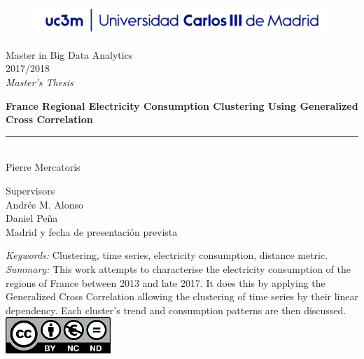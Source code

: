 \begin{titlepage}
\begin{sffamily}
\color{azulUC3M}
\begin{center}
\begin{figure}[htb]
\begin{center}
\vspace*{0.6cm}
\includegraphics[width=15cm]{./latex/imagenes/Portada_Logo.png}
\vspace*{1.6cm}
\end{center}
\end{figure}
\begin{LARGE}
Master in Big Data Analytics \\%
2017/2018 \\%
\vspace*{1cm}
\textsl{Master's Thesis}\\
\end{LARGE}
\Huge{\textbf{France Regional Electricity Consumption Clustering Using Generalized Cross Correlation}} %
\vspace*{1cm}
\rule{80mm}{0.1mm}\\
\huge{Pierre Mercatoris}\\ %
\vspace*{0.5cm}
\begin{Large}
Supervisors\\

Andrés M. Alonso\\
Daniel Peña\\
Madrid y fecha de presentación prevista\\
\end{Large}
\end{center}
\vspace*{1cm}
\color{black}
\emph{Keywords:} Clustering, time series, electricity consumption, distance metric. \\
\emph{Summary:} This work attempts to characterise the electricity consumption
of the regions of France between 2013 and late 2017. It does this by applying
the Generalized Cross Correlation allowing the clustering of time series by
their linear dependency. Each cluster's trend and consumption patterns are then discussed.\\
\includegraphics{./latex/imagenes/creativecommons.png}\\


\end{sffamily}
\end{titlepage}
